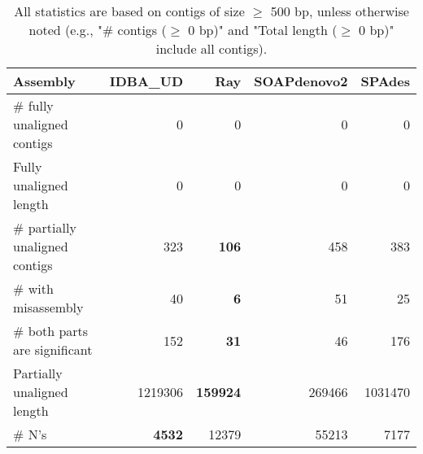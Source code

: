 \documentclass[12pt,a4paper]{article}
\begin{document}
\begin{table}[ht]
\begin{center}
\caption{All statistics are based on contigs of size $\geq$ 500 bp, unless otherwise noted (e.g., "\# contigs ($\geq$ 0 bp)" and "Total length ($\geq$ 0 bp)" include all contigs).}
\begin{tabular}{|l*{4}{|r}|}
\hline
Assembly & IDBA\_UD & Ray & SOAPdenovo2 & SPAdes \\ \hline
\# fully unaligned contigs & 0 & 0 & 0 & 0 \\ \hline
Fully unaligned length & 0 & 0 & 0 & 0 \\ \hline
\# partially unaligned contigs & 323 & {\bf 106} & 458 & 383 \\ \hline
\hspace{5mm}\# with misassembly & 40 & {\bf 6} & 51 & 25 \\ \hline
\hspace{5mm}\# both parts are significant & 152 & {\bf 31} & 46 & 176 \\ \hline
Partially unaligned length & 1219306 & {\bf 159924} & 269466 & 1031470 \\ \hline
\# N's & {\bf 4532} & 12379 & 55213 & 7177 \\ \hline
\end{tabular}
\end{center}
\end{table}
\end{document}
